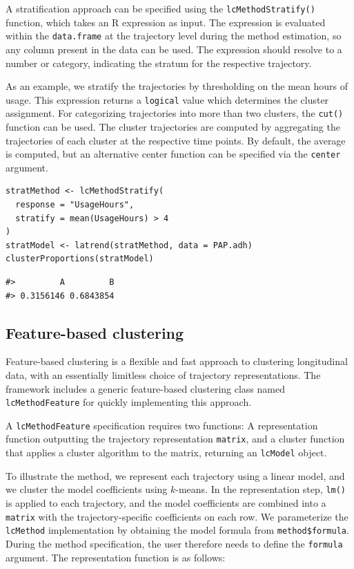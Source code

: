 A stratification approach can be specified using the \texttt{lcMethodStratify()} function, which takes an R expression as input. The expression is evaluated within the \texttt{data.frame} at the trajectory level during the method estimation, so any column present in the data can be used. The expression should resolve to a number or category, indicating the stratum for the respective trajectory.

As an example, we stratify the trajectories by thresholding on the mean hours of usage. This expression returns a \texttt{logical} value which determines the cluster assignment. For categorizing trajectories into more than two clusters, the \texttt{cut()} function can be used. The cluster trajectories are computed by aggregating the trajectories of each cluster at the respective time points. By default, the average is computed, but an alternative center function can be specified via the \texttt{center} argument.

\begin{verbatim}
stratMethod <- lcMethodStratify(
  response = "UsageHours",
  stratify = mean(UsageHours) > 4
)
stratModel <- latrend(stratMethod, data = PAP.adh)
clusterProportions(stratModel)
\end{verbatim}

\begin{verbatim}
#>         A         B 
#> 0.3156146 0.6843854
\end{verbatim}

\subsection{Feature-based clustering}\label{feature-based-clustering-1}

Feature-based clustering is a flexible and fast approach to clustering longitudinal data, with an essentially limitless choice of trajectory representations. The framework includes a generic feature-based clustering class named \texttt{lcMethodFeature} for quickly implementing this approach.

A \texttt{lcMethodFeature} specification requires two functions: A representation function outputting the trajectory representation \texttt{matrix}, and a cluster function that applies a cluster algorithm to the matrix, returning an \texttt{lcModel} object.

To illustrate the method, we represent each trajectory using a linear model, and we cluster the model coefficients using \(k\)-means. In the representation step, \texttt{lm()} is applied to each trajectory, and the model coefficients are combined into a \texttt{matrix} with the trajectory-specific coefficients on each row. We parameterize the \texttt{lcMethod} implementation by obtaining the model formula from \texttt{method\$formula}. During the method specification, the user therefore needs to define the \texttt{formula} argument. The representation function is as follows:

